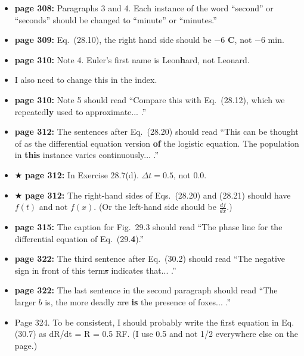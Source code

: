 \documentclass[12pt]{article}
\begin{document}
\begin{itemize}
  \item {\bf page 308:}  Paragraphs 3 and 4.  Each instance of the
    word ``second'' or ``seconds'' should be changed to ``minute'' or
    ``minutes.'' 

  \item {\bf page 309:}  Eq.~(28.10), the right hand side should be
    $-6$ {\bf C}, not $-6$ min.

  \item {\bf page 310:} Note 4.  Euler's first name is Leon{\bf h}ard,
    not Leonard.
  
  \item  I also need to change this in the index. 

  \item {\bf page 310:}  Note 5 should read ``Compare this with
    Eq.~(28.12), which we repeated{\bf ly} used to approximate... .'' 

  \item {\bf page 312:}  The sentences after Eq.~(28.20) should read
    ``This can be thought of as the differential equation version {\bf
    of} the logistic equation.  The population in {\bf this} instance
    varies continuously... .''

  \item $\bigstar$ {\bf page 312:}  In Exercise 28.7(d).  $\Delta t =
    0.5$, not $0.0$.   

  \item $\bigstar$ {\bf page 312:}  The right-hand sides of
    Eqs.~(28.20) and (28.21) should have $f(t)$ and not $f(x)$.  (Or
    the left-hand side should be $\frac{df}{dx}$.)

  \item {\bf page 315:}  The caption for Fig.~29.3 should read ``The
    phase line for the differential equation of Eq.~(29.{\bf 4}).'' 

  \item {\bf page 322:}  The third sentence after Eq.~(30.2) should
    read ``The negative sign in front of this term\sout{s} indicates
    that... .''

  \item {\bf page 322:}  The last sentence in the second paragraph
    should read ``The larger $b$ is, the more deadly \sout{are} {\bf
      is} the presence of foxes... .''

  \item Page 324.  To be consistent, I should probably write the first
   equation in Eq. (30.7) as dR/dt = R = 0.5 RF.  (I use 0.5 and not
   1/2 everywhere else on the page.) 


\end{itemize}
\end{document}
